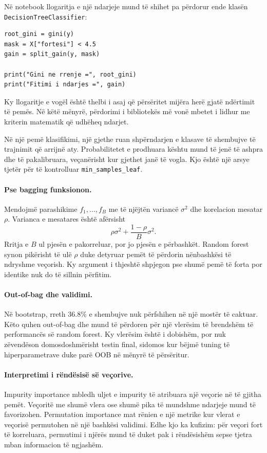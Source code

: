 \documentclass[12pt,a4paper,oneside]{book}
\begin{document}
Në notebook llogaritja e një ndarjeje mund të shihet pa përdorur ende klasën \texttt{DecisionTreeClassifier}:
\begin{lstlisting}[caption={Vlerësimi manual i një ndarjeje me papastërtinë Gini.}]
root_gini = gini(y)
mask = X["fortesi"] < 4.5
gain = split_gain(y, mask)

print("Gini ne rrenje =", root_gini)
print("Fitimi i ndarjes =", gain)
\end{lstlisting}
Ky llogaritje e vogël është thelbi i asaj që përsëritet mijëra herë gjatë ndërtimit të pemës. Në këtë mënyrë, përdorimi i bibliotekës më vonë mbetet i lidhur me kriterin matematik që udhëheq ndarjet.

Në një pemë klasifikimi, një gjethe ruan shpërndarjen e klasave të shembujve të trajnimit që arrijnë aty. Probabilitetet e prodhuara kështu mund të jenë të ashpra dhe të pakalibruara, veçanërisht kur gjethet janë të vogla. Kjo është një arsye tjetër për të kontrolluar \texttt{min\_samples\_leaf}.

\paragraph{Pse bagging funksionon.}
Mendojmë parashikime $f_1,\ldots,f_B$ me të njëjtën variancë $\sigma^2$ dhe korelacion mesatar $\rho$. Varianca e mesatares është afërsisht
\[
\rho\sigma^2+\frac{1-\rho}{B}\sigma^2.
\]
Rritja e $B$ ul pjesën e pakorreluar, por jo pjesën e përbashkët. Random forest synon pikërisht të ulë $\rho$ duke detyruar pemët të përdorin nënbashkësi të ndryshme veçorish. Ky argument i thjeshtë shpjegon pse shumë pemë të forta por identike nuk do të sillnin përfitim.

\paragraph{Out-of-bag dhe validimi.}
Në bootstrap, rreth 36.8\% e shembujve nuk përfshihen në një mostër të caktuar. Këto quhen out-of-bag dhe mund të përdoren për një vlerësim të brendshëm të performancës së random forest. Ky vlerësim është i dobishëm, por nuk zëvendëson domosdoshmërisht testin final, sidomos kur bëjmë tuning të hiperparametrave duke parë OOB në mënyrë të përsëritur.

\paragraph{Interpretimi i rëndësisë së veçorive.}
Impurity importance mbledh uljet e impurity të atribuara një veçorie në të gjitha pemët. Veçoritë me shumë vlera ose shumë pika të mundshme ndarjeje mund të favorizohen. Permutation importance mat rënien e një metrike kur vlerat e veçorisë permutohen në një bashkësi validimi. Edhe kjo ka kufizim: për veçori fort të korreluara, permutimi i njërës mund të duket pak i rëndësishëm sepse tjetra mban informacion të ngjashëm.
\end{document}
